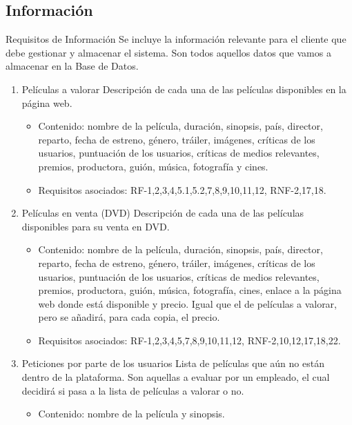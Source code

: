 \documentclass{article}
\begin{document}
    \subsection{Información}
    Requisitos de Información Se incluye la información relevante para el cliente que debe gestionar y almacenar el sistema. Son todos aquellos datos que vamos a almacenar en la Base de Datos.
    \begin{enumerate}[label=\bfseries RI- \arabic*:]

    \item Películas a valorar Descripción de cada una de las películas disponibles en la página web.
        \begin{itemize}
        \item Contenido: nombre de la película, duración, sinopsis, país, director, reparto, fecha de estreno, género, tráiler, imágenes, críticas de los usuarios, puntuación de los usuarios, críticas de medios relevantes, premios, productora, guión, música, fotografía y cines.

        \item Requisitos asociados: RF-1,2,3,4,5.1,5.2,7,8,9,10,11,12, RNF-2,17,18.
        \end{itemize}
    \item Películas en venta (DVD) Descripción de cada una de las películas disponibles para su venta en DVD.
        \begin{itemize}
        \item Contenido: nombre de la película, duración, sinopsis, país, director, reparto, fecha de estreno, género, tráiler, imágenes, críticas de los usuarios, puntuación de los usuarios, críticas de medios relevantes, premios, productora, guión, música, fotografía, cines, enlace a la página web donde está disponible y precio. Igual que el de películas a valorar, pero se añadirá, para cada copia, el precio.

        \item Requisitos asociados: RF-1,2,3,4,5,7,8,9,10,11,12, RNF-2,10,12,17,18,22.
        \end{itemize}
    \item Peticiones por parte de los usuarios Lista de películas que aún no están dentro de la plataforma. Son aquellas a evaluar por un empleado, el cual decidirá si pasa a la lista de películas a valorar o no.
        \begin{itemize}
        \item Contenido: nombre de la película y sinopsis.


\end{itemize}
\end{enumerate}
\end{document}
